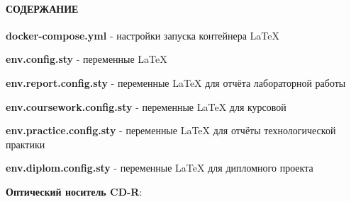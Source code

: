 \documentclass[12pt, a4paper, simple]{eskdtext}
\begin{document}
    

  \thispagestyle{plain}   %
  \pagestyle{plain}       %
  \hspace{0pt}

  \paragraph{СОДЕРЖАНИЕ} \hspace{0pt}

  \hspace{0pt}

  \textbf{docker-compose.yml} - настройки запуска контейнера LaTeX

  \textbf{env.config.sty} - переменные LaTeX

  \textbf{env.report.config.sty} - переменные LaTeX для отчёта лабораторной работы

  \textbf{env.coursework.config.sty} - переменные LaTeX для курсовой

  \textbf{env.practice.config.sty} - переменные LaTeX для отчёты технологической практики

  \textbf{env.diplom.config.sty} - переменные LaTeX для дипломного проекта

  \newpage

  \textbf{Оптический носитель CD-R}:
\end{document}
